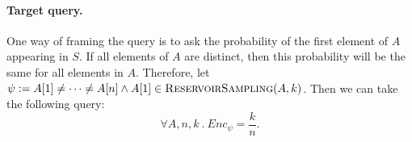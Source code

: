 \documentclass[acmsmall,review,anonymous]{acmart}\settopmatter{printfolios=true,printccs=false,printacmref=false}
\DeclarePairedDelimiter{\abs}{\lvert}{\rvert}
\newcommand*\Let[2]{\State #1 $\gets$ #2}
\begin{document}
\paragraph*{Target query.}
One way of framing the query is to ask the probability of the first element of $A$ appearing in $S$.
% 
If all elements of $A$ are distinct, then this probability will be the same for all elements in $A$.
% 
Therefore, let $\psi := A[1] \neq \cdots \neq A[n] \wedge A[1] \in \textsc{ReservoirSampling}(A,k)$. Then we can take the following query:
\begin{equation*}
  \forall A,n,k~.~Enc_\psi = \frac{k}{n}.
\end{equation*}




\end{document}
